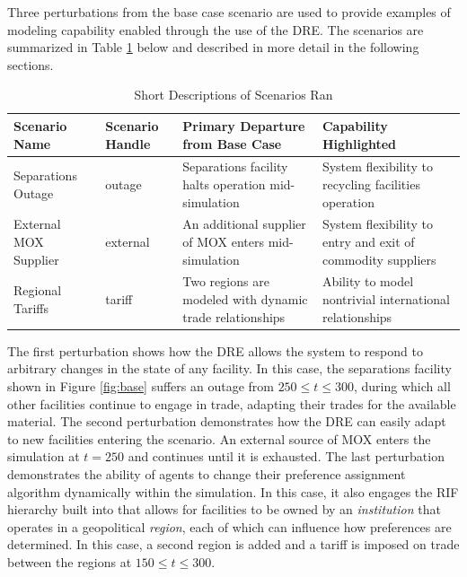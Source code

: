 Three perturbations from the base case scenario are used to provide examples of
modeling capability enabled through the use of the DRE. The scenarios are
summarized in Table \ref{scenarios} below and described in more detail in the
following sections. 

\begin{table}[]
\centering
\caption{Short Descriptions of Scenarios Ran}
\label{scenarios}
\begin{tabularx}{\textwidth}{|p{1.5cm}|p{1.5cm}|X|X|}
\hline
\textbf{Scenario  Name} & \textbf{Scenario Handle} & \textbf{Primary Departure from Base Case}                & \textbf{Capability Highlighted}                             \\ \hline
Separations Outage      & outage                   & Separations facility halts operation mid-simulation      & System flexibility to recycling facilities operation        \\ \hline
External MOX Supplier   & external                 & An additional supplier of MOX enters mid-simulation      & System flexibility to entry and exit of commodity suppliers \\ \hline
Regional Tariffs        & tariff                   & Two regions are modeled with dynamic trade relationships & Ability to model nontrivial international relationships     \\ \hline
\end{tabularx}
\end{table}

The first perturbation shows how the \gls{DRE} allows the system to respond to
arbitrary changes in the state of any facility.  In this case, the separations
facility shown in Figure \ref{fig:base} suffers an outage from $250 \leq t
\leq 300$, during which all other facilities continue to engage in trade,
adapting their trades for the available material.  The second perturbation
demonstrates how the \gls{DRE} can easily adapt to new facilities entering the
scenario.  An external source of MOX enters the simulation at $t = 250$ and
continues until it is exhausted.  The last perturbation demonstrates the
ability of agents to change their preference assignment algorithm dynamically
within the simulation.  In this case, it also engages the \gls{RIF} hierarchy
built into \Cyclus{} that allows for facilities to be owned by an
\textit{institution} that operates in a geopolitical \textit{region}, each of
which can influence how preferences are determined.  In this case, a second
region is added and a tariff is imposed on trade between the regions at $150
\leq t \leq 300$.

